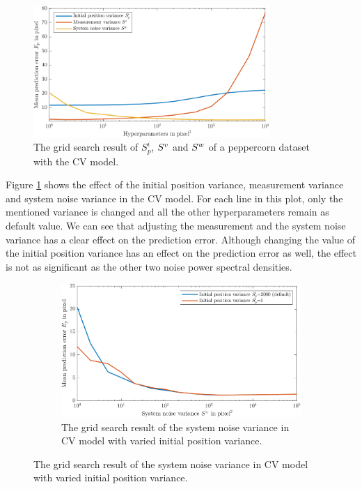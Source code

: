 \begin{figure}[htbp]
\centering
\includegraphics[width=0.8\textwidth]{figures/KF/3cov pfeffer cv.png}
\caption{The grid search result of $S^{i}_{p}$, $S^{\boldmath{v}}$ and $S^{\boldmath{w}}$ of a peppercorn dataset with the CV model.}
\label{3cov}
\end{figure}


Figure \ref{3cov} shows the effect of the initial position variance, measurement variance and system noise variance in the CV model. 
For each line in this plot, only the mentioned variance is changed and all the other hyperparameters remain as default value. We can see that adjusting the measurement and the system noise variance has a clear effect on the prediction error. Although changing the value of the initial position variance has an effect on the prediction error as well, the effect is not as significant as the other two noise power spectral densities. 

\begin{figure}[htbp]
	\centering
	\begin{subfigure}[t]{0.8\textwidth}
		\includegraphics[width=\textwidth]{figures/KF/precov with inicov cv.png}
		\caption{The grid search result of the system noise variance in CV model with varied initial position variance.}
		\label{grid search different default1}
	\end{subfigure}
\end{figure}

